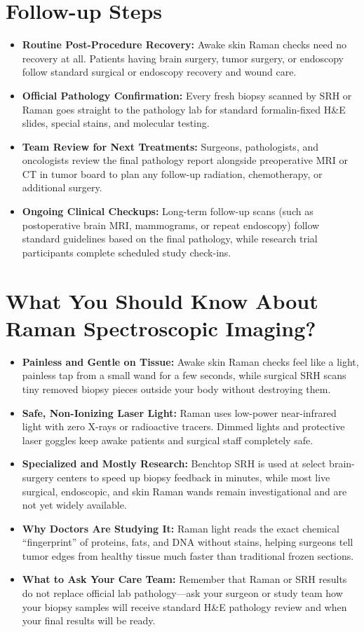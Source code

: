 \section{Follow-up Steps}
\begin{itemize}
  \item \textbf{Routine Post-Procedure Recovery:} Awake skin Raman checks need no recovery at all. Patients having brain surgery, tumor surgery, or endoscopy follow standard surgical or endoscopy recovery and wound care.
  \item \textbf{Official Pathology Confirmation:} Every fresh biopsy scanned by SRH or Raman goes straight to the pathology lab for standard formalin-fixed H\&E slides, special stains, and molecular testing.
  \item \textbf{Team Review for Next Treatments:} Surgeons, pathologists, and oncologists review the final pathology report alongside preoperative MRI or CT in tumor board to plan any follow-up radiation, chemotherapy, or additional surgery.
  \item \textbf{Ongoing Clinical Checkups:} Long-term follow-up scans (such as postoperative brain MRI, mammograms, or repeat endoscopy) follow standard guidelines based on the final pathology, while research trial participants complete scheduled study check-ins.
\end{itemize}

\section{What You Should Know About Raman Spectroscopic Imaging?}
\begin{itemize}
  \item \textbf{Painless and Gentle on Tissue:} Awake skin Raman checks feel like a light, painless tap from a small wand for a few seconds, while surgical SRH scans tiny removed biopsy pieces outside your body without destroying them.
  \item \textbf{Safe, Non-Ionizing Laser Light:} Raman uses low-power near-infrared light with zero X-rays or radioactive tracers. Dimmed lights and protective laser goggles keep awake patients and surgical staff completely safe.
  \item \textbf{Specialized and Mostly Research:} Benchtop SRH is used at select brain-surgery centers to speed up biopsy feedback in minutes, while most live surgical, endoscopic, and skin Raman wands remain investigational and are not yet widely available.
  \item \textbf{Why Doctors Are Studying It:} Raman light reads the exact chemical ``fingerprint'' of proteins, fats, and DNA without stains, helping surgeons tell tumor edges from healthy tissue much faster than traditional frozen sections.
  \item \textbf{What to Ask Your Care Team:} Remember that Raman or SRH results do not replace official lab pathology---ask your surgeon or study team how your biopsy samples will receive standard H\&E pathology review and when your final results will be ready.
\end{itemize}

